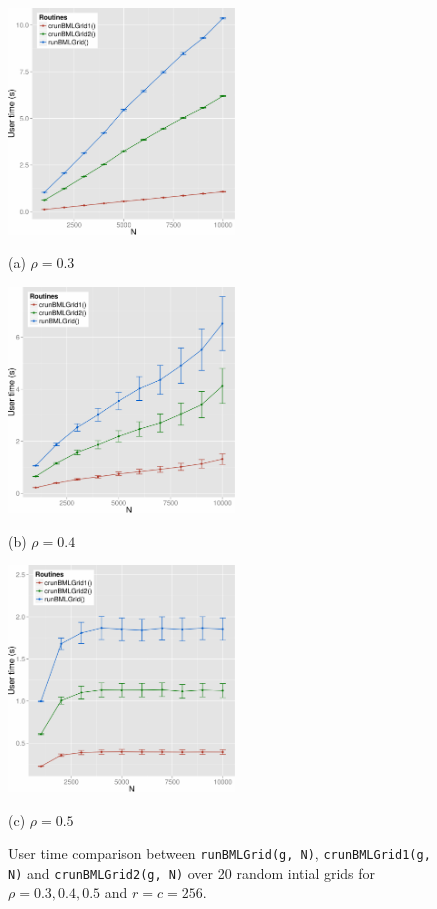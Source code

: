 \documentclass{article}
\begin{document}
\begin{figure}[H]
    \begin{minipage}[b]{0.5\linewidth}
      \centering
      \centerline{\includegraphics[width=6.0cm]{./figs/TestRunningTimeVsNumStep_03.pdf}}
      \centerline{(a) $\rho = 0.3$}\medskip
    \end{minipage}
    \hfill
    \begin{minipage}[b]{0.5\linewidth}
      \centering
      \centerline{\includegraphics[width=6.0cm]{./figs/TestRunningTimeVsNumStep_04.pdf}}
      \centerline{(b) $\rho = 0.4$}\medskip
    \end{minipage}
    \hfill
    \begin{minipage}[b]{1\linewidth}
      \centering
      \centerline{\includegraphics[width=6.0cm]{./figs/TestRunningTimeVsNumStep_05.pdf}}
      \centerline{(c) $\rho = 0.5$}\medskip
    \end{minipage}
    \caption{User time comparison between \texttt{runBMLGrid(g, N)},
    \texttt{crunBMLGrid1(g, N)} and \texttt{crunBMLGrid2(g, N)} over 20
    random intial grids for $\rho = 0.3, 0.4, 0.5$ and $r =
    c = 256$.}
    \label{fig:running_time_vs_numsteps}
\end{figure}
\end{document}

